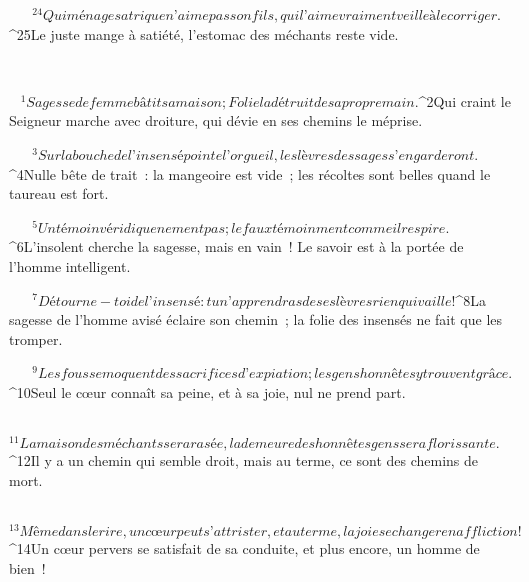            
         
${}^{24}Qui ménage sa trique n’aime pas son fils,
        qui l’aime vraiment veille à le corriger.
        
           
         
${}^{25}Le juste mange à satiété,
        l’estomac des méchants reste vide.
        
           
       
      
         
      \bchapter{}
${}^{1}Sagesse de femme bâtit sa maison ;
        Folie la détruit de sa propre main.
        
           
         
${}^{2}Qui craint le Seigneur marche avec droiture,
        qui dévie en ses chemins le méprise.
        
           
         
${}^{3}Sur la bouche de l’insensé pointe l’orgueil,
        les lèvres des sages s’en garderont.
        
           
         
${}^{4}Nulle bête de trait : la mangeoire est vide ;
        les récoltes sont belles quand le taureau est fort.
        
           
         
${}^{5}Un témoin véridique ne ment pas ;
        le faux témoin ment comme il respire.
        
           
         
${}^{6}L’insolent cherche la sagesse, mais en vain !
        Le savoir est à la portée de l’homme intelligent.
        
           
         
${}^{7}Détourne-toi de l’insensé :
        tu n’apprendras de ses lèvres rien qui vaille !
        
           
         
${}^{8}La sagesse de l’homme avisé éclaire son chemin ;
        la folie des insensés ne fait que les tromper.
        
           
         
${}^{9}Les fous se moquent des sacrifices d’expiation ;
        les gens honnêtes y trouvent grâce.
        
           
         
${}^{10}Seul le cœur connaît sa peine,
        et à sa joie, nul ne prend part.
        
           
         
${}^{11}La maison des méchants sera rasée,
        la demeure des honnêtes gens sera florissante.
        
           
         
${}^{12}Il y a un chemin qui semble droit,
        mais au terme, ce sont des chemins de mort.
        
           
         
${}^{13}Même dans le rire, un cœur peut s’attrister,
        et au terme, la joie se changer en affliction !
        
           
         
${}^{14}Un cœur pervers se satisfait de sa conduite,
        et plus encore, un homme de bien !
        
